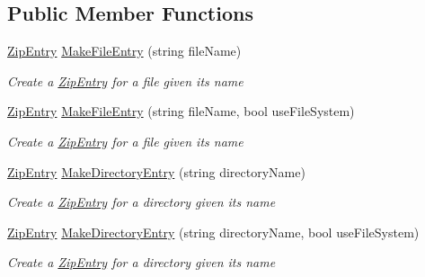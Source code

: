 \subsection*{Public Member Functions}
\begin{DoxyCompactItemize}
\item 
\hyperlink{class_i_c_sharp_code_1_1_sharp_zip_lib_1_1_zip_1_1_zip_entry}{Zip\+Entry} \hyperlink{interface_i_c_sharp_code_1_1_sharp_zip_lib_1_1_zip_1_1_i_entry_factory_abd40e3d5f65ca49251dff1cf9a039010}{Make\+File\+Entry} (string file\+Name)
\begin{DoxyCompactList}\small\item\em Create a \hyperlink{class_i_c_sharp_code_1_1_sharp_zip_lib_1_1_zip_1_1_zip_entry}{Zip\+Entry} for a file given its name \end{DoxyCompactList}\item 
\hyperlink{class_i_c_sharp_code_1_1_sharp_zip_lib_1_1_zip_1_1_zip_entry}{Zip\+Entry} \hyperlink{interface_i_c_sharp_code_1_1_sharp_zip_lib_1_1_zip_1_1_i_entry_factory_a576fc2a664ce3d629d04d12f1b964d87}{Make\+File\+Entry} (string file\+Name, bool use\+File\+System)
\begin{DoxyCompactList}\small\item\em Create a \hyperlink{class_i_c_sharp_code_1_1_sharp_zip_lib_1_1_zip_1_1_zip_entry}{Zip\+Entry} for a file given its name \end{DoxyCompactList}\item 
\hyperlink{class_i_c_sharp_code_1_1_sharp_zip_lib_1_1_zip_1_1_zip_entry}{Zip\+Entry} \hyperlink{interface_i_c_sharp_code_1_1_sharp_zip_lib_1_1_zip_1_1_i_entry_factory_ac7abeeef0810ca110b63406bc1dfab0e}{Make\+Directory\+Entry} (string directory\+Name)
\begin{DoxyCompactList}\small\item\em Create a \hyperlink{class_i_c_sharp_code_1_1_sharp_zip_lib_1_1_zip_1_1_zip_entry}{Zip\+Entry} for a directory given its name \end{DoxyCompactList}\item 
\hyperlink{class_i_c_sharp_code_1_1_sharp_zip_lib_1_1_zip_1_1_zip_entry}{Zip\+Entry} \hyperlink{interface_i_c_sharp_code_1_1_sharp_zip_lib_1_1_zip_1_1_i_entry_factory_ac2cf6ab63aab27361bb3f186ee78b00d}{Make\+Directory\+Entry} (string directory\+Name, bool use\+File\+System)
\begin{DoxyCompactList}\small\item\em Create a \hyperlink{class_i_c_sharp_code_1_1_sharp_zip_lib_1_1_zip_1_1_zip_entry}{Zip\+Entry} for a directory given its name \end{DoxyCompactList}\end{DoxyCompactItemize}

